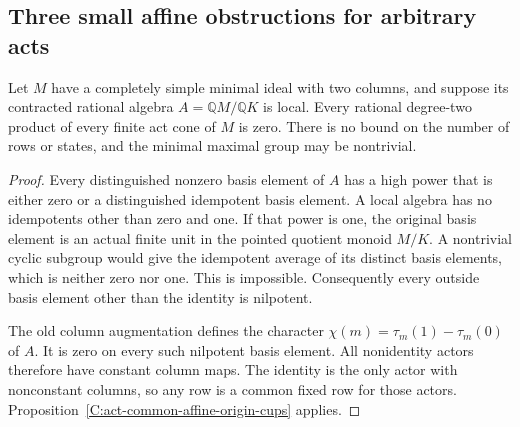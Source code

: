 \subsection{Three small affine obstructions for arbitrary acts}

\begin{lemma}
\label{C:local-two-column-act-cups}
Let $M$ have a completely simple minimal ideal with two
columns, and suppose its contracted rational algebra
$A=\mathbb QM/\mathbb QK$ is local.  Every rational degree-two
product of every finite act cone of $M$ is zero.
There is no bound on the number of rows or states, and the
minimal maximal group may be nontrivial.
\end{lemma}
\begin{proof}
Every distinguished nonzero basis element of $A$ has a high
power that is either zero or a distinguished idempotent basis
element.  A local algebra has no idempotents other than zero
and one.  If that power is one, the original basis element is
an actual finite unit in the pointed quotient monoid $M/K$.
A nontrivial cyclic subgroup would give the idempotent average
of its distinct basis elements, which is neither zero nor one.
This is impossible.  Consequently every outside basis element
other than the identity is nilpotent.

The old column augmentation defines the character
$\chi(m)=\tau_m(1)-\tau_m(0)$ of $A$.
It is zero on every such nilpotent basis element.
All nonidentity actors therefore have constant column maps.
The identity is the only actor with nonconstant columns, so
any row is a common fixed row for those actors.
Proposition~\ref{C:act-common-affine-origin-cups} applies.
\end{proof}


